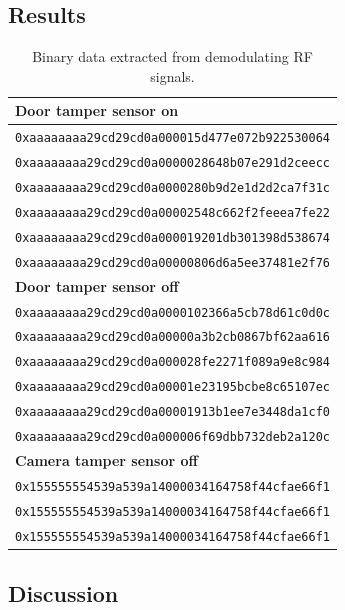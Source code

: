 \subsection{Results}
\begin{table}[!ht]
    \centering
    \begin{tabularx}{\textwidth}{l}
        \hline
        \textbf{Door tamper sensor on} \\ \hline
        \texttt{0xaaaaaaaa29cd29cd0a000015d477e072b922530064} \\
        \texttt{0xaaaaaaaa29cd29cd0a0000028648b07e291d2ceecc} \\
        \texttt{0xaaaaaaaa29cd29cd0a0000280b9d2e1d2d2ca7f31c} \\
        \texttt{0xaaaaaaaa29cd29cd0a00002548c662f2feeea7fe22} \\
        \texttt{0xaaaaaaaa29cd29cd0a000019201db301398d538674} \\
        \texttt{0xaaaaaaaa29cd29cd0a00000806d6a5ee37481e2f76} \\
        \hline
        
        \textbf{Door tamper sensor off} \\ \hline
        \texttt{0xaaaaaaaa29cd29cd0a0000102366a5cb78d61c0d0c} \\
        \texttt{0xaaaaaaaa29cd29cd0a00000a3b2cb0867bf62aa616} \\
        \texttt{0xaaaaaaaa29cd29cd0a000028fe2271f089a9e8c984} \\
        \texttt{0xaaaaaaaa29cd29cd0a00001e23195bcbe8c65107ec} \\
        \texttt{0xaaaaaaaa29cd29cd0a00001913b1ee7e3448da1cf0} \\
        \texttt{0xaaaaaaaa29cd29cd0a000006f69dbb732deb2a120c} \\
        \hline
        
        \textbf{Camera tamper sensor off} \\ \hline
        \texttt{0x155555554539a539a14000034164758f44cfae66f1} \\
        \texttt{0x155555554539a539a14000034164758f44cfae66f1} \\
        \texttt{0x155555554539a539a14000034164758f44cfae66f1} \\
        \hline
    \end{tabularx}
    \caption{Binary data extracted from demodulating RF signals.}
    \label{tb:demodulated-data}
\end{table}

\subsection{Discussion}
\todo
